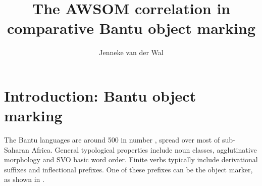 \documentclass[output=paper
,modfonts
,nonflat]{langsci/langscibook}
\title{The AWSOM correlation in comparative Bantu object marking}
\author{%
	Jenneke van der Wal \affiliation {Leiden University Centre for Linguistics} 
}
\begin{document}
\maketitle
	
\section{Introduction: Bantu object marking}


The Bantu languages are around 500 in number \citep[1]{Nurse_Philippson2003}, spread over most of sub-Saharan Africa. General typological properties include noun classes, agglutinative morphology and SVO basic word order. Finite verbs typically include derivational suffixes and inflectional prefixes. One of these prefixes can be the object marker, as shown in .
\end{document}
